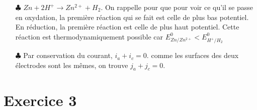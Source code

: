 \documentclass{report}
\begin{document}
\begin{itemize}
	\item[$\clubsuit$] $Zn+2H^+\longrightarrow Zn^{2+}+H_2$. On rappelle pour que pour voir ce qu'il se passe en oxydation, la première réaction qui se fait est celle de plus bas potentiel. En réduction, la première réaction est celle de plus haut potentiel. Cette réaction est thermodynamiquement possible car $E^0_{Zn/Zn^{2+}}<E^0_{H^+/H_2}$
	
	\item[$\clubsuit$] Par conservation du courant, $i_a+i_c=0$. comme les surfaces des deux électrodes sont les mêmes, on trouve $j_a+j_c=0$.
	
\end{itemize}

\section*{Exercice 3}
\end{document}

